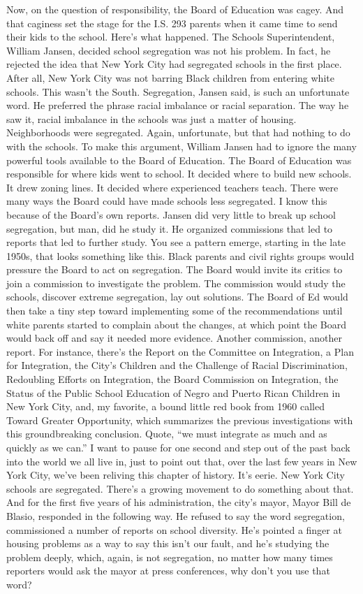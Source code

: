 Now, on the question of responsibility, the Board of Education was
cagey. And that caginess set the stage for the I.S. 293 parents when it
came time to send their kids to the school. Here's what happened. The
Schools Superintendent, William Jansen, decided school segregation was
not his problem. In fact, he rejected the idea that New York City had
segregated schools in the first place. After all, New York City was not
barring Black children from entering white schools. This wasn't the
South. Segregation, Jansen said, is such an unfortunate word. He
preferred the phrase racial imbalance or racial separation. The way he
saw it, racial imbalance in the schools was just a matter of housing.
Neighborhoods were segregated. Again, unfortunate, but that had nothing
to do with the schools. To make this argument, William Jansen had to
ignore the many powerful tools available to the Board of Education. The
Board of Education was responsible for where kids went to school. It
decided where to build new schools. It drew zoning lines. It decided
where experienced teachers teach. There were many ways the Board could
have made schools less segregated. I know this because of the Board's
own reports. Jansen did very little to break up school segregation, but
man, did he study it. He organized commissions that led to reports that
led to further study. You see a pattern emerge, starting in the late
1950s, that looks something like this. Black parents and civil rights
groups would pressure the Board to act on segregation. The Board would
invite its critics to join a commission to investigate the problem. The
commission would study the schools, discover extreme segregation, lay
out solutions. The Board of Ed would then take a tiny step toward
implementing some of the recommendations until white parents started to
complain about the changes, at which point the Board would back off and
say it needed more evidence. Another commission, another report. For
instance, there's the Report on the Committee on Integration, a Plan for
Integration, the City's Children and the Challenge of Racial
Discrimination, Redoubling Efforts on Integration, the Board Commission
on Integration, the Status of the Public School Education of Negro and
Puerto Rican Children in New York City, and, my favorite, a bound little
red book from 1960 called Toward Greater Opportunity, which summarizes
the previous investigations with this groundbreaking conclusion. Quote,
``we must integrate as much and as quickly as we can.'' I want to pause
for one second and step out of the past back into the world we all live
in, just to point out that, over the last few years in New York City,
we've been reliving this chapter of history. It's eerie. New York City
schools are segregated. There's a growing movement to do something about
that. And for the first five years of his administration, the city's
mayor, Mayor Bill de Blasio, responded in the following way. He refused
to say the word segregation, commissioned a number of reports on school
diversity. He's pointed a finger at housing problems as a way to say
this isn't our fault, and he's studying the problem deeply, which,
again, is not segregation, no matter how many times reporters would ask
the mayor at press conferences, why don't you use that word?

